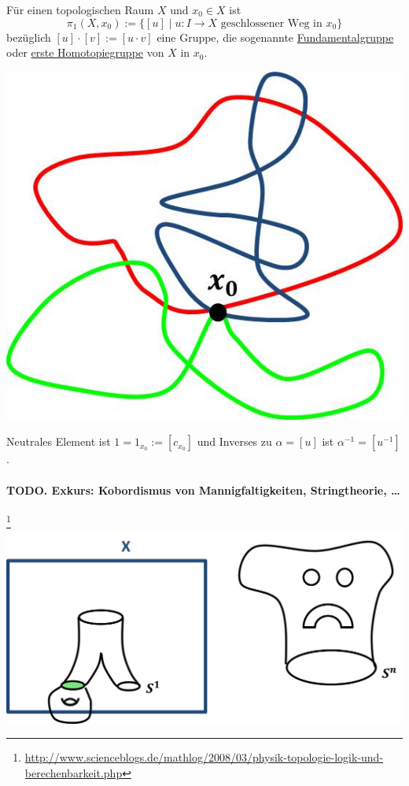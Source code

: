 \documentclass[a4paper,11pt,notitlepage]{report}
\theoremstyle{definition}
\begin{document}
\begin{theorem}{}
	Für einen topologischen Raum $X$ und $x_0 \in X$ ist 
	$$\pi_1 (X,x_0) := \{ [u] \mid u \colon I \rightarrow X \text{ geschlossener Weg in } x_0 \}$$
	bezüglich $[u] \cdot [v] := [u \cdot v]$ eine Gruppe, die sogenannte \underline{Fundamentalgruppe} oder \underline{erste Homotopiegruppe} von $X$ in $x_0$.
	\begin{center}
		 \includegraphics[scale=0.4]{images/Fundamentalgruppe.jpg}
	\end{center}
	
	Neutrales Element ist $1 = 1_{x_0} := [c_{x_0}]$ \newline und Inverses zu $\alpha = [u]$ ist $\alpha^{-1} = [u^{-1}]$.
\end{theorem}

\paragraph{TODO. Exkurs: Kobordismus von Mannigfaltigkeiten, Stringtheorie, \ldots}\footnote{\url{http://www.scienceblogs.de/mathlog/2008/03/physik-topologie-logik-und-berechenbarkeit.php}} \includegraphics[scale=0.4]{images/Kobordismus.jpg} 
\end{document}
